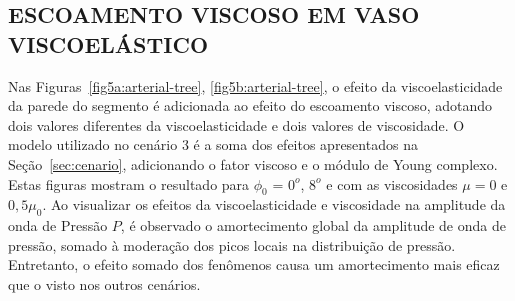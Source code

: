 \subsection{ESCOAMENTO VISCOSO EM VASO VISCOELÁSTICO}\label{sec:cenario3}

Nas Figuras~\ref{fig5a:arterial-tree}, \ref{fig5b:arterial-tree}, o efeito da viscoelasticidade da parede do segmento é adicionada ao efeito do escoamento viscoso, adotando dois valores diferentes da viscoelasticidade e dois valores de viscosidade. O modelo utilizado no cenário 3 é a soma dos efeitos apresentados na Seção~\ref{sec:cenario}, adicionando o fator viscoso e o módulo de Young complexo. Estas figuras mostram o resultado para $\phi_0$ = $0^o$, $8^o$ e com as viscosidades $\mu = 0$ e $0,5 \mu_0$. Ao visualizar os efeitos da viscoelasticidade e viscosidade na amplitude da onda de Pressão $P$, é observado o amortecimento global da amplitude de onda de pressão, somado à moderação dos picos locais na distribuição de pressão. Entretanto, o efeito somado dos fenômenos causa um amortecimento mais eficaz que o visto nos outros cenários.

